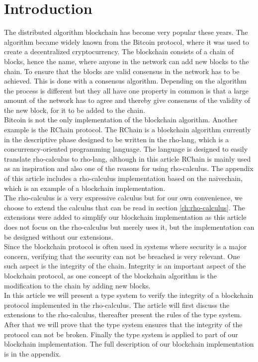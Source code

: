 \section{Introduction}
The distributed algorithm blockchain has become very popular these years. The algorithm became widely known from the Bitcoin protocol, where it was used to create a decentralized cryptocurrency\citep{website:blockchain}. The blockchain consists of a chain of blocks, hence the name, where anyone in the network can add new blocks to the chain. To ensure that the blocks are valid consensus in the network has to be achieved. This is done with a consensus algorithm. Depending on the algorithm the process is different but they all have one property in common is that a large amount of the network has to agree and thereby give consensus of the validity of the new block, for it to be added to the chain.\\
Bitcoin is not the only implementation of the blockchain algorithm. Another example is the RChain protocol\citep{website:RChain}. The RChain is a blockchain algorithm currently in the descriptive phase designed to be written in the rho-lang, which is a concurrency-oriented programming language. The language is designed to easily translate rho-calculus to rho-lang\citep{website:rho-lang}, although in this article RChain is mainly used as an inspiration and also one of the reasons for using rho-calculus. The appendix of this article includes a rho-calculus implementation based on the naivechain, which is an example of a blockchain implementation\citep{naivechain}.\\

The rho-calculus is a very expressive calculus but for our own convenience, we choose to extend the calculus that can be read in section \ref{ch:rho-calculus}. The extensions were added to simplify our blockchain implementation as this article does not focus on the rho-calculus but merely uses it, but the implementation can be designed without our extensions.\\

Since the blockchain protocol is often used in systems where security is a major concern, verifying that the security can not be breached is very relevant. One such aspect is the integrity of the chain.
Integrity is an important aspect of the blockchain protocol, as one concept of the blockchain algorithm is the modification to the chain by adding new blocks.\\

In this article we will present a type system to verify the integrity of a blockchain protocol implemented in the rho-calculus. The article will first discuss the extensions to the rho-calculus, thereafter present the rules of the type system. After that we will prove that the type system ensures that the integrity of the protocol can not be broken. Finally the type system is applied to part of our blockchain implementation. The full description of our blockchain implementation is in the appendix.
